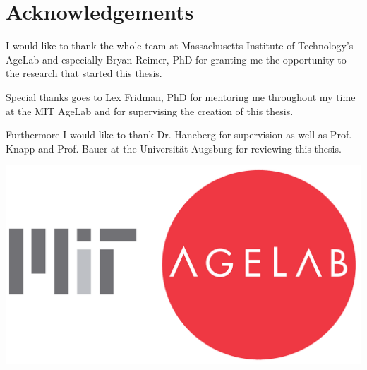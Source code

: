 \chapter*{Acknowledgements}
\label{acknowledgements}


I would like to thank the whole team at Massachusetts Institute of Technology's AgeLab and especially Bryan Reimer, PhD for granting me the opportunity to the research that started this thesis.

Special thanks goes to Lex Fridman, PhD for mentoring me throughout my time at the MIT AgeLab and for supervising the creation of this thesis. %


Furthermore I would like to thank Dr. Haneberg for supervision as well as Prof. Knapp and Prof. Bauer at the Universität Augsburg for reviewing this thesis.


\vspace{1.5cm}
\begin{center}
	\includegraphics[width=.6\textwidth]{./images/logos/agelab}
\end{center}
